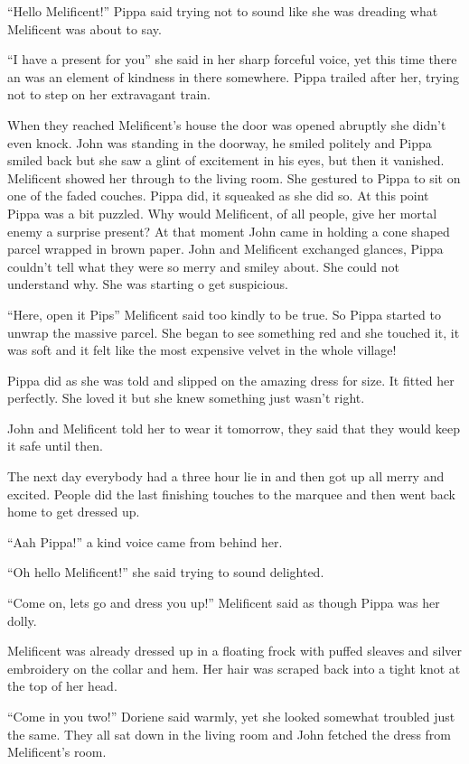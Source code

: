 ``Hello Melificent!'' Pippa said trying not to sound like she was
dreading what Melificent was about to say.

``I have a present for you'' she said in her sharp forceful voice, yet
this time there an was an element of kindness in there somewhere. Pippa
trailed after her, trying not to step on her extravagant train.

When they reached Melificent's house the door was opened abruptly she
didn't even knock. John was standing in the doorway, he smiled politely
and Pippa smiled back but she saw a glint of excitement in his eyes, but
then it vanished. Melificent showed her through to the living room. She
gestured to Pippa to sit on one of the faded couches. Pippa did, it
squeaked as she did so. At this point Pippa was a bit puzzled. Why would
Melificent, of all people, give her mortal enemy a surprise present? At
that moment John came in holding a cone shaped parcel wrapped in brown
paper. John and Melificent exchanged glances, Pippa couldn't tell what
they were so merry and smiley about. She could not understand why. She
was starting o get suspicious.

``Here, open it Pips'' Melificent said too kindly to be true. So Pippa
started to unwrap the massive parcel. She began to see something red and
she touched it, it was soft and it felt like the most expensive velvet
in the whole village!

Pippa did as she was told and slipped on the amazing dress for size. It
fitted her perfectly. She loved it but she knew something just wasn't
right.

John and Melificent told her to wear it tomorrow, they said that they
would keep it safe until then.

The next day everybody had a three hour lie in and then got up all merry
and excited. People did the last finishing touches to the marquee and
then went back home to get dressed up.

``Aah Pippa!'' a kind voice came from behind her.

``Oh hello Melificent!'' she said trying to sound delighted.

``Come on, lets go and dress you up!'' Melificent said as though Pippa
was her dolly.

Melificent was already dressed up in a floating frock with puffed
sleaves and silver embroidery on the collar and hem. Her hair was
scraped back into a tight knot at the top of her head.

``Come in you two!'' Doriene said warmly, yet she looked somewhat
troubled just the same. They all sat down in the living room and John
fetched the dress from Melificent's room.

